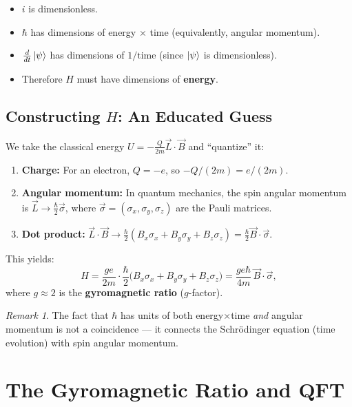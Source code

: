 \documentclass[11pt,a4paper]{article}
\theoremstyle{definition}
\theoremstyle{plain}
\theoremstyle{remark}
\newtheorem{remark}{Remark}[section]
\begin{document}
\begin{itemize}
    \item $i$ is dimensionless.
    \item $\hbar$ has dimensions of energy $\times$ time (equivalently, angular momentum).
    \item $\frac{d}{dt}\ket{\psi}$ has dimensions of $1/\text{time}$ (since $\ket{\psi}$ is dimensionless).
    \item Therefore $H$ must have dimensions of \textbf{energy}.
\end{itemize}

\subsection{Constructing $H$: An Educated Guess}

We take the classical energy $U = -\frac{Q}{2m}\vec{L}\cdot\vec{B}$ and ``quantize'' it:

\begin{enumerate}[label=\textbf{Step \arabic*:}]
    \item \textbf{Charge:} For an electron, $Q = -e$, so $-Q/(2m) = e/(2m)$.
    \item \textbf{Angular momentum:} In quantum mechanics, the spin angular momentum is $\vec{L} \to \frac{\hbar}{2}\vec{\sigma}$, where $\vec{\sigma} = (\sigma_x, \sigma_y, \sigma_z)$ are the Pauli matrices.
    \item \textbf{Dot product:} $\vec{L}\cdot\vec{B} \to \frac{\hbar}{2}(B_x\sigma_x + B_y\sigma_y + B_z\sigma_z) = \frac{\hbar}{2}\vec{B}\cdot\vec{\sigma}$.
\end{enumerate}

This yields:
\[
    H = \frac{ge}{2m}\cdot\frac{\hbar}{2}\bigl(B_x\sigma_x + B_y\sigma_y + B_z\sigma_z\bigr) = \frac{ge\hbar}{4m}\,\vec{B}\cdot\vec{\sigma},
\]
where $g \approx 2$ is the \textbf{gyromagnetic ratio} ($g$-factor).

\begin{remark}
    The fact that $\hbar$ has units of both energy$\times$time \emph{and} angular momentum is not a coincidence --- it connects the Schr\"odinger equation (time evolution) with spin angular momentum.
\end{remark}

\section{The Gyromagnetic Ratio and QFT}
\end{document}
